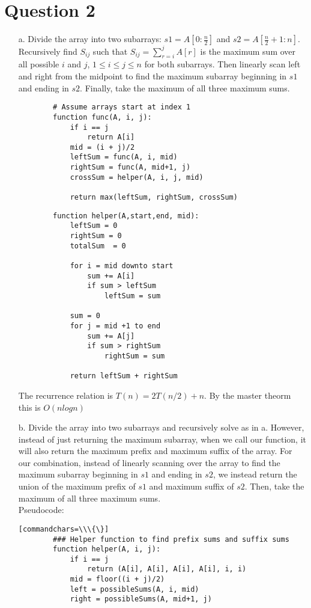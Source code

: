 \documentclass[12pt]{article}
\begin{document}
\section*{Question 2}
\begin{enumerate}
    \item[a.] Divide the array into two subarrays: $s1 = A[0:\frac{n}{2}]$ and $s2 = A[\frac{n}{2} + 1:n]$. Recursively find $S_{ij}$ such that $S_{ij} = \sum_{r=i}^j A[r]$ is the maximum sum over all possible $i$ and $j$, $1 \leq i \leq j \leq n$ for both subarrays. Then linearly scan left and right from the midpoint to find the maximum subarray beginning in $s1$ and ending in $s2$. Finally, take the maximum of all three maximum sums. 
    \begin{verbatim}
        # Assume arrays start at index 1
        function func(A, i, j):
            if i == j
                return A[i]
            mid = (i + j)/2
            leftSum = func(A, i, mid)
            rightSum = func(A, mid+1, j)
            crossSum = helper(A, i, j, mid)
        
            return max(leftSum, rightSum, crossSum)
    \end{verbatim}
    
    \begin{verbatim}
        function helper(A,start,end, mid):
            leftSum = 0
            rightSum = 0
            totalSum  = 0
        
            for i = mid downto start
                sum += A[i]
                if sum > leftSum
                    leftSum = sum
            
            sum = 0
            for j = mid +1 to end
                sum += A[j]
                if sum > rightSum
                    rightSum = sum
            
            return leftSum + rightSum
    \end{verbatim}
    
    The recurrence relation is $T(n) = 2T(n/2) + n$. By the master theorm this is $O(nlogn)$
    
    \item[b.] Divide the array into two subarrays and recursively solve as in a. However, instead of just returning the maximum subarray, when we call our function, it will also return the maximum prefix and maximum suffix of the array. For our combination, instead of linearly scanning over the array to find the maximum subarray beginning in $s1$ and ending in $s2$, we instead return the union of the maximum 
    prefix of $s1$ and maximum suffix of $s2$. Then, take the maximum of all three maximum sums.
    \\  
    Pseudocode:
    \begin{verbatim}[commandchars=\\\{\}]
        ### Helper function to find prefix sums and suffix sums
        function helper(A, i, j):
            if i == j
                return (A[i], A[i], A[i], A[i], i, i)
            mid = floor((i + j)/2)
            left = possibleSums(A, i, mid)
            right = possibleSums(A, mid+1, j)


\end{verbatim}
\end{enumerate}
\end{document}
